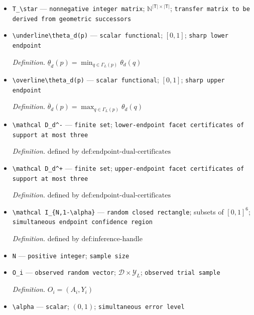 \documentclass{article}
\begin{document}
\begin{itemize}
  \par\smallskip\noindent\emph{Definition.} \((c_L)_t=|\{h\in\mathcal H_L:\operatorname{type}(h)=t\}|\)
  \item \texttt{T\_\allowbreak{}\textbackslash{}\allowbreak{}star} --- \texttt{nonnegative integer matrix}; \(\mathbb N^{|\mathsf T|\times|\mathsf T|}\); \texttt{transfer matrix to be derived from geometric successors}
  \item \texttt{\textbackslash{}\allowbreak{}underline\textbackslash{}\allowbreak{}theta\_\allowbreak{}d(p)} --- \texttt{scalar functional}; \([0,1]\); \texttt{sharp lower endpoint}
  \par\smallskip\noindent\emph{Definition.} \(\underline\theta_d(p)=\min_{q\in\Gamma_L(p)}\theta_d(q)\)
  \item \texttt{\textbackslash{}\allowbreak{}overline\textbackslash{}\allowbreak{}theta\_\allowbreak{}d(p)} --- \texttt{scalar functional}; \([0,1]\); \texttt{sharp upper endpoint}
  \par\smallskip\noindent\emph{Definition.} \(\overline\theta_d(p)=\max_{q\in\Gamma_L(p)}\theta_d(q)\)
  \item \texttt{\textbackslash{}\allowbreak{}mathcal D\_\allowbreak{}d\textasciicircum{}-\allowbreak{}} --- \texttt{finite set}; \texttt{lower-\allowbreak{}endpoint facet certificates of support at most three}
  \par\smallskip\noindent\emph{Definition.} defined by \(\text{def:endpoint-dual-certificates}\)
  \item \texttt{\textbackslash{}\allowbreak{}mathcal D\_\allowbreak{}d\textasciicircum{}+\allowbreak{}} --- \texttt{finite set}; \texttt{upper-\allowbreak{}endpoint facet certificates of support at most three}
  \par\smallskip\noindent\emph{Definition.} defined by \(\text{def:endpoint-dual-certificates}\)
  \item \texttt{\textbackslash{}\allowbreak{}mathcal I\_\allowbreak{}\{N,\allowbreak{}1-\allowbreak{}\textbackslash{}\allowbreak{}alpha\}\allowbreak{}} --- \texttt{random closed rectangle}; subsets of \([0,1]^6\); \texttt{simultaneous endpoint confidence region}
  \par\smallskip\noindent\emph{Definition.} defined by \(\text{def:inference-handle}\)
  \item \texttt{N} --- \texttt{positive integer}; \texttt{sample size}
  \item \texttt{O\_\allowbreak{}i} --- \texttt{observed random vector}; \(\mathcal D\times\mathcal Y_L\); \texttt{observed trial sample}
  \par\smallskip\noindent\emph{Definition.} \(O_i=(A_i,Y_i)\)
  \item \texttt{\textbackslash{}\allowbreak{}alpha} --- \texttt{scalar}; \((0,1)\); \texttt{simultaneous error level}
\end{itemize}
\end{document}

